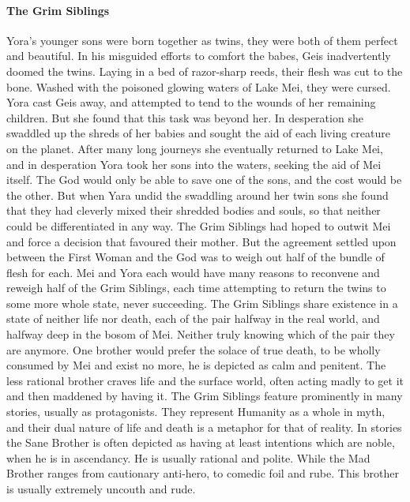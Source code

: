 \paragraph{The Grim Siblings}
Yora’s younger sons were born together as twins, they were both of them perfect and beautiful. In his misguided efforts to comfort the babes, Geis inadvertently doomed the twins. Laying in a bed of razor-sharp reeds, their flesh was cut to the bone. Washed with the poisoned glowing waters of Lake Mei, they were cursed. Yora cast Geis away, and attempted to tend to the wounds of her remaining children. But she found that this task was beyond her. In desperation she swaddled up the shreds of her babies and sought the aid of each living creature on the planet. After many long journeys she eventually returned to Lake Mei, and in desperation Yora took her sons into the waters, seeking the aid of Mei itself. The God would only be able to save one of the sons, and the cost would be the other. But when Yara undid the swaddling around her twin sons she found that they had cleverly mixed their shredded bodies and souls, so that neither could be differentiated in any way. The Grim Siblings had hoped to outwit Mei and force a decision that favoured their mother. But the agreement settled upon between the First Woman and the God was to weigh out half of the bundle of flesh for each. Mei and Yora each would have many reasons to reconvene and reweigh half of the Grim Siblings, each time attempting to return the twins to some more whole state, never succeeding. The Grim Siblings share existence in a state of neither life nor death, each of the pair halfway in the real world, and halfway deep in the bosom of Mei. Neither truly knowing which of the pair they are anymore. One brother would prefer the solace of true death, to be wholly consumed by Mei and exist no more, he is depicted as calm and penitent. The less rational brother craves life and the surface world, often acting madly to get it and then maddened by having it. The Grim Siblings feature prominently in many stories, usually as protagonists. They represent Humanity as a whole in myth, and their dual nature of life and death is a metaphor for that of reality. In stories the Sane Brother is often depicted as having at least intentions which are noble, when he is in ascendancy. He is usually rational and polite. While the Mad Brother ranges from cautionary anti-hero, to comedic foil and rube. This brother is usually extremely uncouth and rude.

